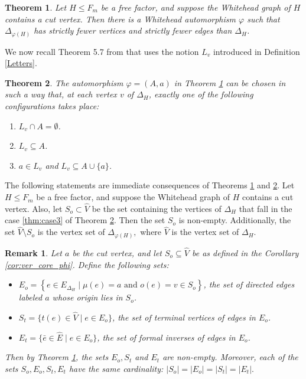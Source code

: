 \documentclass{article}
\newtheorem{mythm}{Theorem}[section]
\newtheorem{myrem}{Remark}[section]
\begin{document}
\begin{mythm}\label{Whitehead2}
Let $H\leq F_m$ be a free factor, and suppose the Whitehead graph of $H$ contains a cut vertex. Then there is a Whitehead automorphism $\varphi$ such that $\Delta_{\varphi(H)}$ has strictly fewer vertices and strictly fewer edges than $\Delta_{H}$.
\end{mythm}

We now recall Theorem 5.7 from \cite{ascari2021fine} that uses the notion $L_v$ introduced in Definition \ref{Letters}.

\begin{mythm}\label{finesse2}
The automorphism $\varphi=(A,a)$ in \textnormal{Theorem \ref{Whitehead2}} can be chosen in such a way that, at each vertex $v$ of $\Delta_H$, exactly one of the following configurations takes place:
\begin{enumerate}
    \item $L_v\cap A = \emptyset$.
    \item $L_v\subseteq A$.
    \item \label{thm:case3} $a\in L_v$ and $L_v\subseteq A\cup\{a\}$.
\end{enumerate}
\end{mythm}
The following statements are immediate consequences of Theorems \ref{Whitehead2} and \ref{finesse2}.
{\mycor \label{cor:ver_core_phi} Let $H\leq F_m$ be a free factor, and suppose the Whitehead graph of $H$ contains a cut vertex. Also, let $S_o \subset \widehat{V}$ be the set containing the vertices of $\Delta_H$ that fall in the case \ref{thm:case3} of \textnormal{Theorem \ref{finesse2}}. Then the set $S_o$ is non-empty. Additionally, the set $\widehat{V}\setminus S_o$ is the vertex set of $\Delta_{\varphi(H)},$ where $\widehat{V}$ is the vertex set of $\Delta_H$.}

\begin{myrem}\label{rem:collaps_sets}
Let $a$ be the cut vertex, and let $S_o \subseteq \widehat{V}$ be as defined in the Corollary \ref{cor:ver_core_phi}. Define the following sets:
\begin{itemize}
    \item  $E_o = \left\{ e \in E_{\Delta_H} \mid \mu(e) = a \text{ and } o(e) = v \in S_o \right\}$, the set of directed edges labeled $a$ whose origin lies in $S_o$.    
    \item $S_t = \bigl\{ t(e) \in \widehat{V} \mid e \in E_o  \bigr\}$, the set of terminal vertices of edges in $E_o$.
    \item $E_t = \{ \bar{e} \in \widehat{E} \mid e \in E_o \}$, the set of formal inverses of edges in \( E_o \).
\end{itemize}
Then by Theorem \ref{Whitehead2}, the sets $E_o, S_t$ and $E_t$ are non-empty. Moreover, each of the sets $S_o, E_o, S_t, E_t$ have the same cardinality:
$|S_o| = |E_o| = |S_t| = |E_t|.$
\end{myrem}
\end{document}

